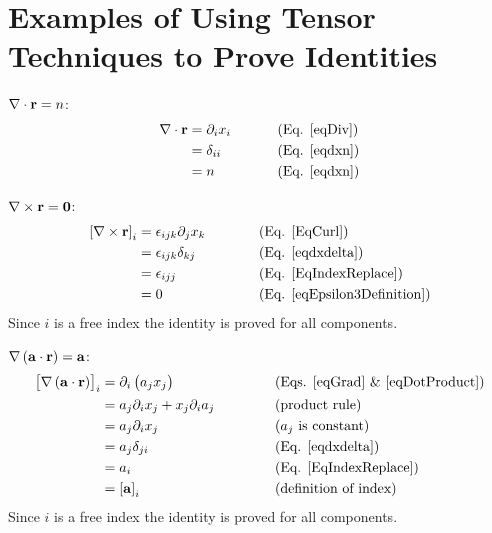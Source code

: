 \section{Examples of Using Tensor Techniques to Prove 
Identities\label{subProvingIdentities}}

 $\nabla\cdot\mathbf{ r}=n$:
\begin{equation}
\begin{aligned}\nabla\cdot\mathbf{ r} & =\partial_{i}x_{i} & 
\,\,\,\,\,\,\,\,\,\,\,\,\,\, & \text{(Eq. \ref{eqDiv})}\\
 & =\delta_{ii} &  & \text{(Eq. \ref{eqdxn})}\\
 & =n &  & \text{(Eq. \ref{eqdxn})}
\end{aligned}
\end{equation}


 $\nabla\times\mathbf{ r}=\mathbf{ 0}$:
\begin{equation}
\begin{aligned}\left[\nabla\times\mathbf{ r}\right]_{i} & 
=\epsilon_{ijk}\partial_{j}x_{k} & \,\,\,\,\,\,\,\,\,\,\,\,\,\,\,\,\, & 
\text{(Eq. \ref{EqCurl})}\\
 & =\epsilon_{ijk}\delta_{kj} &  & \text{(Eq. \ref{eqdxdelta})}\\
 & =\epsilon_{ijj} &  & \text{(Eq. \ref{EqIndexReplace})}\\
 & =0 &  & \text{(Eq. \ref{eqEpsilon3Definition})}
\end{aligned}
\end{equation}
Since $i$ is a free index the identity is proved for all components.

 $\nabla\left(\mathbf{ a}\cdot\mathbf{ r}\right)=\mathbf{ a}$:
\begin{equation}
\begin{aligned}\left[\nabla\left(\mathbf{ a}\cdot\mathbf{ r}\right)\right]_{i} & 
=\partial_{i}\left(a_{j}x_{j}\right) & \,\,\,\,\,\,\,\,\,\,\,\,\,\,\,\,\,\,\,\, 
& \text{(Eqs. \ref{eqGrad} \& \ref{eqDotProduct})}\\
 & =a_{j}\partial_{i}x_{j}+x_{j}\partial_{i}a_{j} &  & \text{(product rule)}\\
 & =a_{j}\partial_{i}x_{j} &  & \text{(\ensuremath{a_{j}} is constant)}\\
 & =a_{j}\delta_{ji} &  & \text{(Eq. \ref{eqdxdelta})}\\
 & =a_{i} &  & \text{(Eq. \ref{EqIndexReplace})}\\
 & =\left[\mathbf{ a}\right]_{i} &  & \text{(definition of index)}
\end{aligned}
\end{equation}
Since $i$ is a free index the identity is proved for all components.

